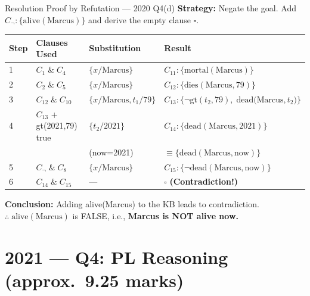 \documentclass[12pt,a4paper]{article}
\newcommand{\cl}[1]{\{#1\}}      %
\begin{document}
\begin{solbox}{Resolution Proof by Refutation --- 2020 Q4(d)}
\textbf{Strategy:} Negate the goal. Add $C_{\neg}:\cl{\mathrm{alive(Marcus)}}$ and derive the empty clause $\square$.

\medskip
\begin{tabular}{@{}l@{\quad}l@{\quad}l@{\quad}l@{}}
  \toprule
  \textbf{Step} & \textbf{Clauses Used} & \textbf{Substitution} & \textbf{Result} \\
  \midrule
  1 & $C_1\;\&\;C_4$ & $\{x/\mathrm{Marcus}\}$ & $C_{11}:\cl{\mathrm{mortal(Marcus)}}$ \\[3pt]
  2 & $C_2\;\&\;C_5$ & $\{x/\mathrm{Marcus}\}$ & $C_{12}:\cl{\mathrm{dies(Marcus,79)}}$ \\[3pt]
  3 & $C_{12}\;\&\;C_{10}$ & $\{x/\mathrm{Marcus},t_1/79\}$ & $C_{13}:\cl{\neg\mathrm{gt}(t_2,79),\;\mathrm{dead(Marcus},t_2)}$ \\[3pt]
  4 & $C_{13}$ + gt(2021,79) true & $\{t_2/2021\}$ & $C_{14}:\cl{\mathrm{dead(Marcus,2021)}}$ \\
    & & (now=2021) & $\equiv\cl{\mathrm{dead(Marcus,now)}}$ \\[3pt]
  5 & $C_{\neg}\;\&\;C_8$ & $\{x/\mathrm{Marcus}\}$ & $C_{15}:\cl{\neg\mathrm{dead(Marcus,now)}}$ \\[3pt]
  6 & $C_{14}\;\&\;C_{15}$ & --- & $\boxed{\square}$ \textbf{(Contradiction!)} \\
  \bottomrule
\end{tabular}

\medskip
\textbf{Conclusion:} Adding alive(Marcus) to the KB leads to contradiction.\\
$\therefore\;\mathrm{alive(Marcus)}$ is FALSE, i.e., \textbf{Marcus is NOT alive now.} \checkmark
\end{solbox}

\newpage
\section{2021 --- Q4: PL Reasoning (approx.\ 9.25 marks)}
\end{document}

